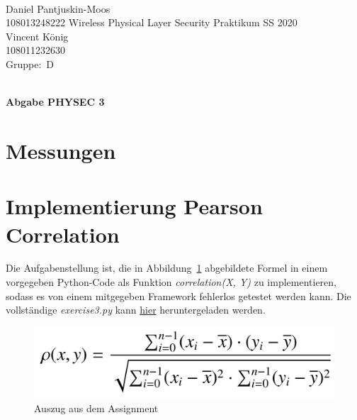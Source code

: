 \documentclass[12pt,a4paper]{article}
\newcommand{\student}{Daniel Pantjuskin-Moos\\ 108013248222 } %
\newcommand{\partner}{Vincent König\\ 108011232630} %
\newcommand{\group}{D} %
\newcommand{\hwheadtwo}{$ $
  \vspace{-2cm}
  
\noindent \student \qquad \qquad  Wireless Physical Layer Security Praktikum \hfill SS 2020 \\
\noindent \partner \\
\noindent Gruppe:~\group\\
$ $

  
\begin{center}    
{\Large \bf Abgabe PHYSEC 3}
\end{center}
}
\begin{document}
\hwheadtwo

\section{Messungen}

\section{Implementierung Pearson Correlation}


Die Aufgabenstellung ist, die in Abbildung~\ref{fig:Label1}
abgebildete Formel in einem vorgegeben Python-Code als Funktion 
\textit{correlation(X, Y)} zu implementieren, sodass es von einem 
mitgegeben Framework fehlerlos getestet werden kann. 
Die vollständige \textit{exercise3.py} kann  
\href{https://mega.nz/file/7gwx0BwR#dwkLdHX7AglZKYwp9poGQ-tEL20GtaqFy8LoT4TtV_g}
{hier} 
heruntergeladen werden.

\begin{figure}[hbt!]
	\centering
		\includegraphics[width=1\textwidth ]
		{Bilder/a2-pearson-formel.png}
		\caption{Auszug aus dem Assignment}
		\label{fig:Label1}
\end{figure}
\end{document}
